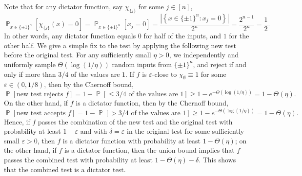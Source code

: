 \documentclass[letterpaper, reqno,11pt]{article}
\newcommand{\PP}{\mathop{{}\mathbb{P}}}
\begin{document}
\begin{enumerate}
\begin{enumerate}
    Note that for any dictator function, say $\chi_{\{ j \}}$ for some $j \in [n]$,
    $$ \PP_{x \in \{ \pm 1 \}^n}\left[\chi_{\{ j \}}(x) = 0\right] = \PP_{x \in \{ \pm 1 \}^n}\left[x_j = 0\right] = \frac{\left|\left\{ x \in \{ \pm 1 \}^n : x_j = 0 \right\}\right|}{2^n} = \frac{2^{n - 1}}{2^n} = \frac{1}{2}. $$
    In other words, any dictator function equals $0$ for half of the inputs, and $1$ for the other half. We give a simple fix to the test by applying the following new test before the original test. For any sufficiently small $\eta > 0$, we independently and uniformly sample $\Theta(\log (1/\eta))$ random inputs from $\{ \pm 1 \}^n$, and reject if and only if more than $3/4$ of the values are $1$. If $f$ is $\varepsilon$-close to $\chi_\emptyset \equiv 1$ for some $\varepsilon \in (0, 1/8)$, then by the Chernoff bound,
    $$ \PP[\text{new test rejects $f$}] = 1 - \PP[\text{$\leq 3/4$ of the values are $1$}] \geq 1 - e^{-\Theta(\log (1/\eta))} = 1 - \Theta(\eta). $$
    On the other hand, if $f$ is a dictator function, then by the Chernoff bound,
    $$ \PP[\text{new test accepts $f$}] = 1 - \PP[\text{$>3/4$ of the values are $1$}] \geq 1 - e^{-\Theta(\log(1/\eta))} = 1 - \Theta(\eta). $$
    Hence, if $f$ passes the combination of the new test and the original test with probability at least $1 - \varepsilon$ and with $\delta = \varepsilon$ in the original test for some sufficiently small $\varepsilon > 0$, then $f$ is a dictator function with probability at least $1 - \Theta(\eta)$; on the other hand, if $f$ is a dictator function, then the union bound implies that $f$ passes the combined test with probability at least $1 - \Theta(\eta) - \delta$. This shows that the combined test is a dictator test.
  \end{enumerate}
\end{enumerate}
\end{document}
